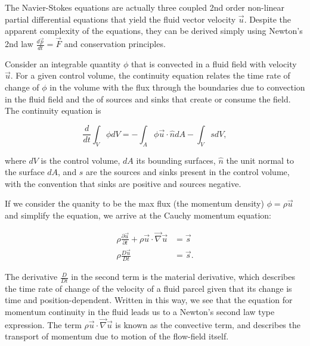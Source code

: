 			The Navier-Stokes equations are actually three coupled 2nd order non-linear partial differential equations that yield the fluid vector velocity $\vec{u}$. Despite the apparent complexity of the equations, they can be derived simply using Newton's 2nd law $\frac{d\vec{p}}{dt}=\vec{F}$ and conservation principles.
			
			Consider an integrable quantity $\phi$ that is convected in a fluid field with velocity $\vec{u}$. For a given control volume, the continuity equation relates the time rate of change of $\phi$ in the volume with the flux through the boundaries due to convection in the fluid field and the of sources and sinks that create or consume the field. The continuity equation is 
			
			\[ \frac{d}{dt}\int_{V}\phi dV=-\int_{A}\phi\vec{u}\cdot\hat{n}dA-\int_{V}s dV, \]
			
			where $dV$ is the control volume, $dA$ its bounding surfaces, $\hat{n}$ the unit normal to the surface $dA$, and $s$ are the sources and sinks present in the control volume, with the convention that sinks are positive and sources negative.
			
			If we consider the quanity to be the max flux (the momentum density) $\phi=\rho \vec{u}$ and simplify the equation, we arrive at the Cauchy momentum equation:
			
			\begin{equation}  \label{eq:cauchymomentum}
				\begin{split}
					\rho\frac{\partial\vec{u}}{\partial t}+\rho\vec{u}\cdot\vec{\nabla}\vec{u} &= \vec{s} \\
					\rho\frac{D\vec{u}}{Dt} &= \vec{s}.
				\end{split}
			\end{equation}
			
			The derivative $\frac{D}{Dt}$ in the second term is the material derivative, which describes the time rate of change of the velocity of a fluid parcel given that its change is time and position-dependent. Written in this way, we see that the equation for momentum continuity in the fluid leads us to a Newton's second law type expression. The term $\rho\vec{u}\cdot\vec{\nabla}\vec{u}$ is known as the convective term, and describes the transport of momentum due to motion of the flow-field itself.
			
